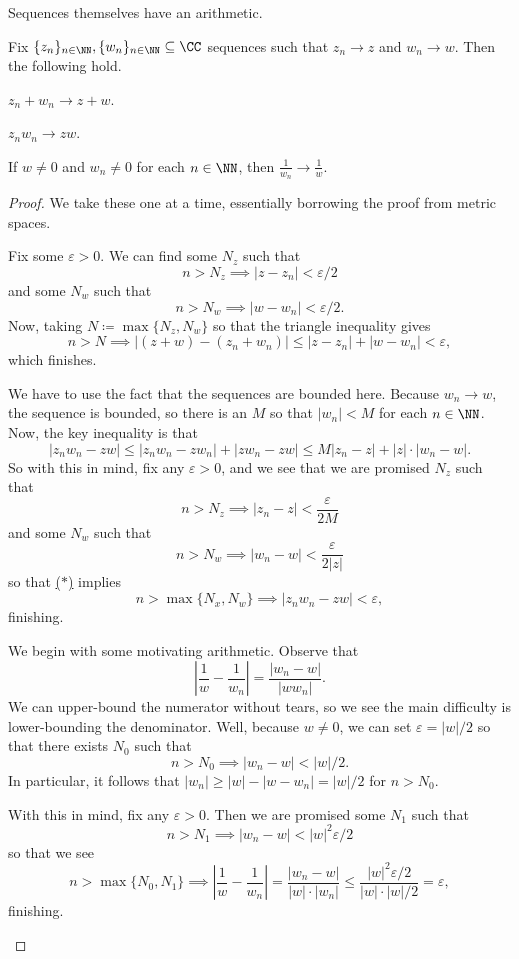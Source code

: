 Sequences themselves have an arithmetic.
\begin{proposition}
	Fix $\{z_n\}_{n\in\NN},\{w_n\}_{n\in\NN}\subseteq\CC$ sequences such that $z_n\to z$ and $w_n\to w$. Then the following hold.
	\begin{listalph}
		\item $z_n+w_n\to z+w$.
		\item $z_nw_n\to zw$.
		\item If $w\ne0$ and $w_n\ne0$ for each $n\in\NN$, then $\frac1{w_n}\to\frac1w$.
	\end{listalph}
\end{proposition}
\begin{proof}
	We take these one at a time, essentially borrowing the proof from metric spaces.
	\begin{listalph}
		\item Fix some $\varepsilon>0$. We can find some $N_z$ such that
		\[n>N_z\implies|z-z_n|<\varepsilon/2\]
		and some $N_w$ such that
		\[n>N_w\implies|w-w_n|<\varepsilon/2.\]
		Now, taking $N\coloneqq \max\{N_z,N_w\}$ so that the triangle inequality gives
		\[n>N\implies|(z+w)-(z_n+w_n)|\le|z-z_n|+|w-w_n|<\varepsilon,\]
		which finishes.

		\item We have to use the fact that the sequences are bounded here. Because $w_n\to w$, the sequence is bounded, so there is an $M$ so that $|w_n|<M$ for each $n\in\NN$. Now, the key inequality is that
		\[|z_nw_n-zw|\le|z_nw_n-zw_n|+|zw_n-zw|\le M|z_n-z|+|z|\cdot|w_n-w|.\tag{$*$}\label{eq:multbound}\]
		So with this in mind, fix any $\varepsilon>0$, and we see that we are promised $N_z$ such that
		\[n>N_z\implies|z_n-z|<\frac\varepsilon{2M}\]
		and some $N_w$ such that
		\[n>N_w\implies|w_n-w|<\frac\varepsilon{2|z|}\]
		so that \hyperref[eq:multbound]{($*$)} implies
		\[n>\max\{N_x,N_w\}\implies|z_nw_n-zw|<\varepsilon,\]
		finishing.

		\item We begin with some motivating arithmetic. Observe that
		\[\left|\frac1w-\frac1{w_n}\right|=\frac{|w_n-w|}{|ww_n|}.\]
		We can upper-bound the numerator without tears, so we see the main difficulty is lower-bounding the denominator. Well, because $w\ne0$, we can set $\varepsilon=|w|/2$ so that there exists $N_0$ such that
		\[n>N_0\implies|w_n-w|<|w|/2.\]
		In particular, it follows that $|w_n|\ge|w|-|w-w_n|=|w|/2$ for $n>N_0$.

		With this in mind, fix any $\varepsilon>0$. Then we are promised some $N_1$ such that
		\[n>N_1\implies|w_n-w|<|w|^2\varepsilon/2\]
		so that we see
		\[n>\max\{N_0,N_1\}\implies\left|\frac1w-\frac1{w_n}\right|=\frac{|w_n-w|}{|w|\cdot|w_n|}\le\frac{|w|^2\varepsilon/2}{|w|\cdot|w|/2}=\varepsilon,\]
		finishing.
		\qedhere
	\end{listalph}
\end{proof}

